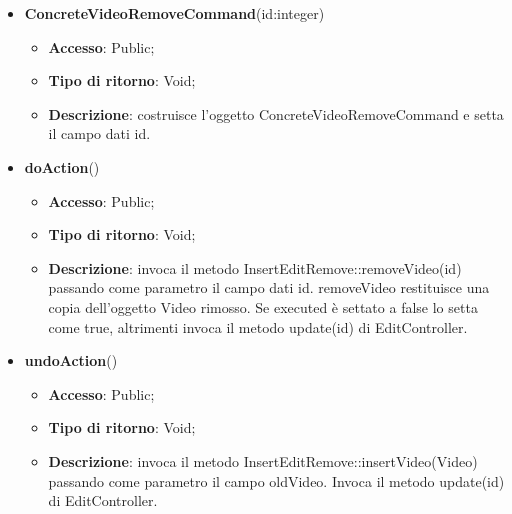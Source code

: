 {{{	
	\begin{itemize}
		\item \textbf{ConcreteVideoRemoveCommand}(id:integer)
		\begin{itemize}
			\item \textbf{Accesso}: Public;
			\item \textbf{Tipo di ritorno}: Void;
			\item \textbf{Descrizione}: costruisce l’oggetto ConcreteVideoRemoveCommand e setta il campo dati id.
		\end{itemize}
		\item \textbf{doAction}()
		\begin{itemize}
			\item \textbf{Accesso}: Public;
			\item \textbf{Tipo di ritorno}: Void;
			\item \textbf{Descrizione}: invoca il metodo InsertEditRemove::removeVideo(id) passando come parametro il campo dati id. removeVideo restituisce una copia dell’oggetto Video rimosso. Se executed è settato a false lo setta come true, altrimenti invoca il metodo update(id) di EditController.
		\end{itemize}
		\item \textbf{undoAction}()
		\begin{itemize}
			\item \textbf{Accesso}: Public;
			\item \textbf{Tipo di ritorno}: Void;
			\item \textbf{Descrizione}: invoca il metodo InsertEditRemove::insertVideo(Video) passando come parametro il campo oldVideo. Invoca il metodo update(id) di EditController.
		\end{itemize}
	\end{itemize}
	}
}}
